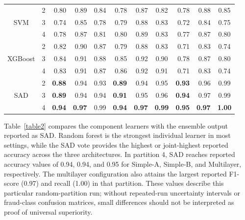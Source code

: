 \documentclass[12pt]{article}
\begin{document}
\begin{table}[H]
{\begin{tabular}{lrrrrrrrrrr}
            \hline
            \multicolumn{1}{c}{\multirow{3}{*}{SVM}} & \multicolumn{1}{c}{2} & 0.80 & 0.89 & \multicolumn{1}{c}{0.84} & 0.78 & 0.87 & \multicolumn{1}{c}{0.82} & 0.78 & 0.88 & \multicolumn{1}{c}{0.85}  \\
            \multicolumn{1}{c}{} & \multicolumn{1}{c}{3} & 0.74 & 0.85 & \multicolumn{1}{c}{0.78} & 0.79 & 0.88 & \multicolumn{1}{c}{0.83} & 0.72 & 0.84 & \multicolumn{1}{c}{0.75}  \\
            \multicolumn{1}{c}{} & \multicolumn{1}{c}{4} & 0.78 & 0.87 & \multicolumn{1}{c}{0.81} & 0.80 & 0.89 & \multicolumn{1}{c}{0.83} & 0.77 & 0.87 & \multicolumn{1}{c}{0.80}   \\
            \hline
            \multicolumn{1}{c}{\multirow{3}{*}{XGBoost}} & \multicolumn{1}{c}{2} & 0.82 & 0.90 & \multicolumn{1}{c}{0.87} & 0.79 & 0.88 & \multicolumn{1}{c}{0.83} & 0.71 & 0.83 & \multicolumn{1}{c}{0.74}  \\
            \multicolumn{1}{c}{} & \multicolumn{1}{c}{3} & 0.84 & 0.91 & \multicolumn{1}{c}{0.88} & 0.85 & 0.92 & \multicolumn{1}{c}{0.90} & 0.78 & 0.87 & \multicolumn{1}{c}{0.80}  \\
            \multicolumn{1}{c}{} & \multicolumn{1}{c}{4} & 0.83 & 0.91 & \multicolumn{1}{c}{0.87} & 0.86 & 0.92 & \multicolumn{1}{c}{0.91} & 0.71 & 0.83 & \multicolumn{1}{c}{0.74}  \\
            \hline
            \multicolumn{1}{c}{\multirow{3}{*}{SAD}} & \multicolumn{1}{c}{2} & \textbf{0.88} & 0.94 & \multicolumn{1}{c}{0.93} & \textbf{0.89} & 0.94 & \multicolumn{1}{c}{0.95} & \textbf{0.93} & 0.96 & \multicolumn{1}{c}{0.99}  \\
            \multicolumn{1}{c}{} & \multicolumn{1}{c}{3} & \textbf{0.89} & 0.94 & \multicolumn{1}{c}{0.94} & \textbf{0.91} & 0.95 & \multicolumn{1}{c}{0.96} & \textbf{0.94} & 0.97 & \multicolumn{1}{c}{0.99}  \\
            \multicolumn{1}{c}{} & \multicolumn{1}{c}{4} & \textbf{0.94} & \textbf{0.97} & \multicolumn{1}{c}{0.99} & \textbf{0.94} & \textbf{0.97} & \multicolumn{1}{c}{\textbf{0.99}} & \textbf{0.95} & \textbf{0.97} & \multicolumn{1}{c}{\textbf{1.00}}  \\
            \hline
        \end{tabular}}
    \end{table}
Table~\ref{table2} compares the component learners with the ensemble output
reported as SAD. Random forest is the strongest individual learner in most
settings, while the SAD vote provides the highest or joint-highest reported
accuracy across the three architectures. In partition 4, SAD reaches reported
accuracy values of 0.94, 0.94, and 0.95 for Simple-A, Simple-B, and Multilayer,
respectively. The multilayer configuration also attains the largest reported
F1-score (0.97) and recall (1.00) in that partition. These values describe this
particular random-partition run; without repeated-run uncertainty intervals or
fraud-class confusion matrices, small differences should not be interpreted as
proof of universal superiority.
\end{document}
